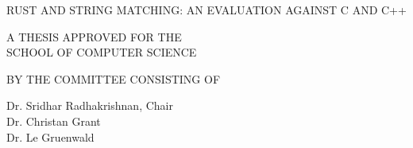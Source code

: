 \thispagestyle{empty}
\begin{center}
RUST AND STRING MATCHING: AN EVALUATION AGAINST C AND C++ \\

\vspace{1.0in}

A THESIS APPROVED FOR THE \\
SCHOOL OF COMPUTER SCIENCE \\

\vspace{2.0in}

BY THE COMMITTEE CONSISTING OF \\
\end{center}

\begin{flushright}
Dr. Sridhar Radhakrishnan, Chair \\
Dr. Christan Grant \\
Dr. Le Gruenwald \\

\end{flushright}

\pagebreak
